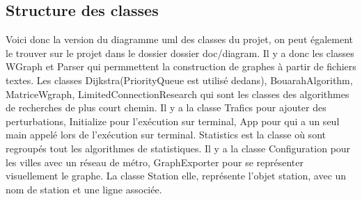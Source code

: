 \documentclass[french, 12pt]{article}
\begin{document}
\newpage
\subsection{Structure des classes}
Voici donc la version du diagramme uml des classes du projet, on peut également le trouver sur le projet dans le dossier dossier doc/diagram. Il y a donc les classes WGraph et Parser qui permmettent la construction de graphes à partir de fichiers textes. Les classes Dijkstra(PriorityQueue est utilisé dedans), BouarahAlgorithm, MatriceWgraph, LimitedConnectionResearch qui sont les classes des algorithmes de recherches de plus court chemin. Il y a la classe Trafics pour ajouter des perturbations, Initialize pour l'exécution sur terminal, App pour qui a un seul main appelé lors de l'exécution sur terminal. Statistics est la classe où sont regroupés tout les algorithmes de statistiques. Il y a la classe Configuration pour les villes avec un réseau de métro, GraphExporter pour se représenter visuellement le graphe. La classe Station elle, représente l'objet station, avec un nom de station et une ligne associée.


\end{document}
